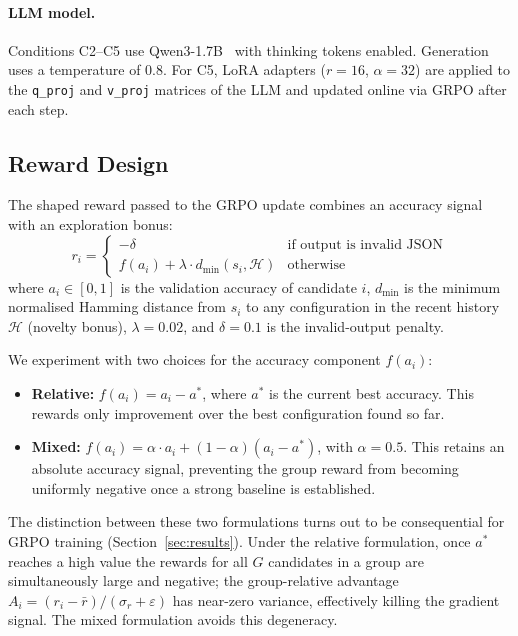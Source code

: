 \paragraph{LLM model.}
Conditions C2--C5 use Qwen3-1.7B~\citep{qwen3} with thinking tokens enabled.
Generation uses a temperature of 0.8.
For C5, LoRA adapters ($r{=}16$, $\alpha{=}32$) are applied to the
\texttt{q\_proj} and \texttt{v\_proj} matrices of the LLM and updated
online via GRPO after each step.

\subsection{Reward Design}
\label{sec:reward}

The shaped reward passed to the GRPO update combines an accuracy signal
with an exploration bonus:
\begin{equation}
r_i =
\begin{cases}
-\delta & \text{if output is invalid JSON} \\[4pt]
f(a_i) + \lambda \cdot d_{\min}(s_i, \mathcal{H}) & \text{otherwise}
\end{cases}
\label{eq:reward}
\end{equation}
where $a_i \in [0,1]$ is the validation accuracy of candidate $i$,
$d_{\min}$ is the minimum normalised Hamming distance from $s_i$ to any
configuration in the recent history $\mathcal{H}$ (novelty bonus),
$\lambda{=}0.02$, and $\delta{=}0.1$ is the invalid-output penalty.

We experiment with two choices for the accuracy component $f(a_i)$:

\begin{itemize}
    \item \textbf{Relative:} $f(a_i) = a_i - a^*$, where $a^*$ is the
    current best accuracy. This rewards only improvement over the best
    configuration found so far.
    \item \textbf{Mixed:} $f(a_i) = \alpha \cdot a_i +
    (1-\alpha)(a_i - a^*)$, with $\alpha{=}0.5$.
    This retains an absolute accuracy signal, preventing the group reward
    from becoming uniformly negative once a strong baseline is established.
\end{itemize}

The distinction between these two formulations turns out to be consequential
for GRPO training (Section~\ref{sec:results}).
Under the relative formulation, once $a^*$ reaches a high value the rewards
for all $G$ candidates in a group are simultaneously large and negative;
the group-relative advantage
$A_i = (r_i - \bar{r}) / (\sigma_r + \varepsilon)$
has near-zero variance, effectively killing the gradient signal.
The mixed formulation avoids this degeneracy.
